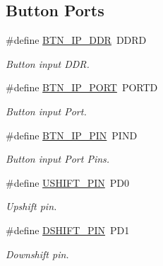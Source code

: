 \subsection*{Button Ports}
\begin{DoxyCompactItemize}
\item 
\#define \hyperlink{group__port_defs_ga0f1aed08f5269f1bddc80c20ecaec0be}{B\-T\-N\-\_\-\-I\-P\-\_\-\-D\-D\-R}~D\-D\-R\-D
\begin{DoxyCompactList}\small\item\em Button input D\-D\-R. \end{DoxyCompactList}\item 
\#define \hyperlink{group__port_defs_ga6ac943017d31877e3b86387e14c9b006}{B\-T\-N\-\_\-\-I\-P\-\_\-\-P\-O\-R\-T}~P\-O\-R\-T\-D
\begin{DoxyCompactList}\small\item\em Button input Port. \end{DoxyCompactList}\item 
\#define \hyperlink{group__port_defs_ga220b3ddb5e9bac9ed273e011f267a536}{B\-T\-N\-\_\-\-I\-P\-\_\-\-P\-I\-N}~P\-I\-N\-D
\begin{DoxyCompactList}\small\item\em Button input Port Pins. \end{DoxyCompactList}\item 
\#define \hyperlink{group__port_defs_gac4a361c6ecdb8ef9a4c7a7253fa0feb8}{U\-S\-H\-I\-F\-T\-\_\-\-P\-I\-N}~P\-D0
\begin{DoxyCompactList}\small\item\em Upshift pin. \end{DoxyCompactList}\item 
\#define \hyperlink{group__port_defs_ga7f2aeb6091a43ad2b243e35a521ec5b0}{D\-S\-H\-I\-F\-T\-\_\-\-P\-I\-N}~P\-D1
\begin{DoxyCompactList}\small\item\em Downshift pin. \end{DoxyCompactList}\end{DoxyCompactItemize}

